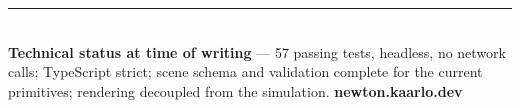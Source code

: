 \documentclass[10pt,a4paper]{article}
\begin{document}
\vspace{6pt}
{\color{rule}\rule{\linewidth}{0.7pt}}\\[2pt]
{\small\color{soft}
\textbf{Technical status at time of writing} --- 57 passing tests, headless, no network
calls; TypeScript strict; scene schema and validation complete for the current primitives;
rendering decoupled from the simulation.
\hfill\textbf{newton.kaarlo.dev}}
\end{document}
